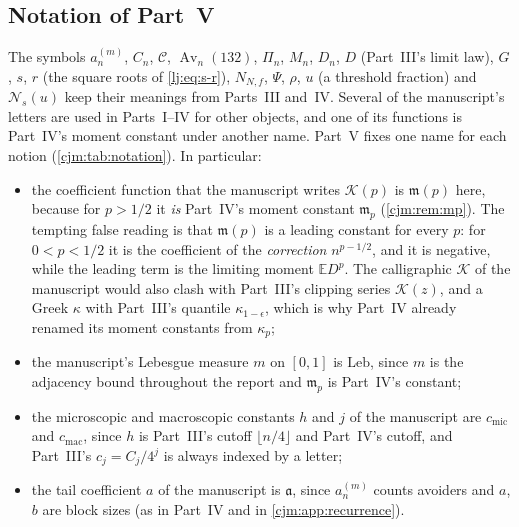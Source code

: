 \documentclass[11pt,a4paper]{article}
\theoremstyle{definition}\newaliascnt{definition}{theorem}
\theoremstyle{remark}\newaliascnt{remark}{theorem}
\newcommand{\Av}{\operatorname{Av}}
\newcommand{\Cat}{\mathcal C}
\newcommand{\ljE}{\mathbb E}
\newcommand{\ljK}{\mathcal K}
\newcommand{\cjmic}{c_{\mathrm{mic}}}
\newcommand{\cjmac}{c_{\mathrm{mac}}}
\newcommand{\cjLeb}{\mathrm{Leb}}
\begin{document}
\subsection{Notation of Part~V}
\label{cjm:sec:notation}
The symbols $a_n^{(m)}$, $C_n$, $\Cat$, $\Av_n(132)$, $\Pi_n$, $M_n$, $D_n$,
$D$ (Part~III's limit law), $G$, $s$, $r$ (the square roots of
\eqref{lj:eq:s-r}), $N_{N,f}$, $\Psi$, $\rho$, $u$ (a threshold fraction) and
$\mathcal N_s(u)$ keep their meanings from Parts~III and~IV. Several of the
manuscript's letters are used in Parts~I--IV for other objects, and one of its
functions is Part~IV's moment constant under another name. Part~V fixes one
name for each notion (\cref{cjm:tab:notation}). In particular:
\begin{itemize}
\item the coefficient function that the manuscript writes $\mathcal K(p)$ is
 $\mathfrak m(p)$ here, because for $p>1/2$ it \emph{is} Part~IV's moment
 constant $\mathfrak m_p$ (\cref{cjm:rem:mp}). The tempting false reading is
 that $\mathfrak m(p)$ is a leading constant for every $p$: for $0<p<1/2$ it
 is the coefficient of the \emph{correction} $n^{p-1/2}$, and it is negative,
 while the leading term is the limiting moment $\ljE D^p$. The calligraphic
 $\mathcal K$ of the manuscript would also clash with Part~III's clipping
 series $\ljK(z)$, and a Greek $\kappa$ with Part~III's quantile
 $\kappa_{1-\epsilon}$, which is why Part~IV already renamed its moment
 constants from $\kappa_p$;
\item the manuscript's Lebesgue measure $m$ on $[0,1]$ is $\cjLeb$, since $m$
 is the adjacency bound throughout the report and $\mathfrak m_p$ is
 Part~IV's constant;
\item the microscopic and macroscopic constants $h$ and $j$ of the manuscript
 are $\cjmic$ and $\cjmac$, since $h$ is Part~III's cutoff
 $\lfloor n/4\rfloor$ and Part~IV's cutoff, and Part~III's $c_j=C_j/4^j$ is
 always indexed by a letter;
\item the tail coefficient $a$ of the manuscript is $\mathfrak a$, since
 $a_n^{(m)}$ counts avoiders and $a$, $b$ are block sizes (as in Part~IV and
 in \cref{cjm:app:recurrence}).
\end{itemize}
\end{document}
